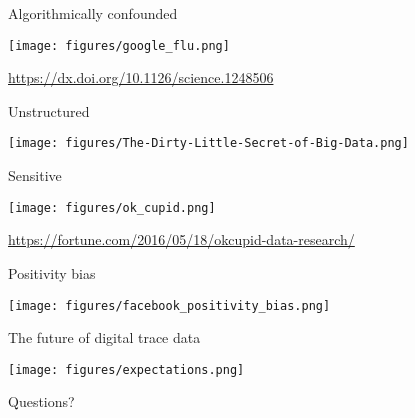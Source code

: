 \documentclass{beamer}
\def\vf{\vfill}
\begin{document}
\begin{frame}{Algorithmically confounded}

\begin{center}
	\texttt{[image: figures/google\_flu.png]}

\end{center}
\vf
\tiny{\url{https://dx.doi.org/10.1126/science.1248506}}


\end{frame}

\begin{frame}{Unstructured}

\begin{center}
	\texttt{[image: figures/The-Dirty-Little-Secret-of-Big-Data.png]}
	
\end{center}

\end{frame}

\begin{frame}{Sensitive}

\begin{center}
	\texttt{[image: figures/ok\_cupid.png]}
	
\end{center}
\vf
\tiny{\url{https://fortune.com/2016/05/18/okcupid-data-research/}}


\end{frame}


\begin{frame}{Positivity bias}

\begin{center}
	\texttt{[image: figures/facebook\_positivity\_bias.png]}
	
\end{center}

\end{frame}


\begin{frame}{The future of digital trace data}

\begin{center}
	\texttt{[image: figures/expectations.png]}
	
\end{center}

\end{frame}



\begin{frame}[standout]

\begin{center}
	\LARGE
	Questions?
\end{center}

\end{frame}
\end{document}

